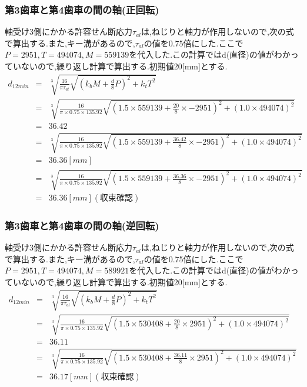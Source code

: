 \subsubsection{第3歯車と第4歯車の間の軸(正回転)}
軸受け3側にかかる許容せん断応力$\tau_{al}$は,ねじりと軸力が作用しないので,次の式で算出する.また,キー溝があるので,$\tau_{al}$の値を0.75倍にした.ここで$P=2951,T=494074, M=559139$を代入した.この計算ではd(直径)の値がわかっていないので,繰り返し計算で算出する.初期値20[mm]とする.
\begin{eqnarray}
d_{12min}&=& \sqrt [3]{ \frac{16}{\pi \tau_{al}}\sqrt{(k_bM+\frac{d}{8}P)^2+k_tT^2} }\\
       &=& \sqrt [3]{ \frac{16}{\pi \times 0.75 \times 135.92} \sqrt{(1.5 \times 559139 +\frac{20}{8}\times -2951)^2+(1.0 \times 494074)^2} }\nonumber\\
       &=& 36.42\\
       &=& \sqrt [3]{ \frac{16}{\pi \times 0.75 \times 135.92} \sqrt{(1.5 \times 559139 +\frac{36.42}{8}\times -2951)^2+(1.0 \times 494074)^2} }\nonumber\\
&=& 36.36[mm]\\
       &=& \sqrt [3]{ \frac{16}{\pi \times 0.75 \times 135.92} \sqrt{(1.5 \times 559139 +\frac{36.36}{8}\times -2951)^2+(1.0 \times 494074)^2} }\nonumber\\
         &=& 36.36[mm](収束確認)
\end{eqnarray}
\subsubsection{第3歯車と第4歯車の間の軸(逆回転)}
軸受け3側にかかる許容せん断応力$\tau_{al}$は,ねじりと軸力が作用しないので,次の式で算出する.また,キー溝があるので,$\tau_{al}$の値を0.75倍にした.ここで$P=2951,T=494074, M=589921$を代入した.この計算ではd(直径)の値がわかっていないので,繰り返し計算で算出する.初期値20[mm]とする.
\begin{eqnarray}
d_{12min}&=& \sqrt [3]{ \frac{16}{\pi \tau_{al}}\sqrt{(k_bM+\frac{d}{8}P)^2+k_tT^2} }\\
&=& \sqrt [3]{ \frac{16}{\pi \times 0.75 \times 135.92} \sqrt{(1.5 \times 530408 +\frac{20}{8}\times 2951)^2+(1.0 \times 494074)^2} }\nonumber\\
&=& 36.11\\
&=& \sqrt [3]{ \frac{16}{\pi \times 0.75 \times 135.92} \sqrt{(1.5 \times 530408 +\frac{36.11}{8}\times 2951)^2+(1.0 \times 494074)^2} }\nonumber\\
         &=& 36.17[mm](収束確認)
\end{eqnarray}

